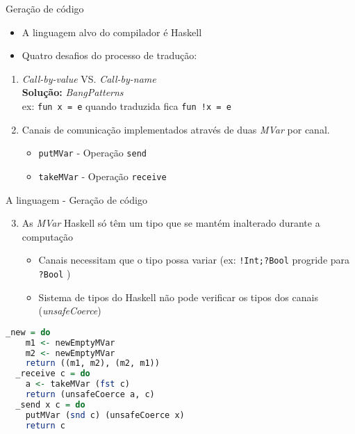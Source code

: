 \begin{frame}[fragile]{Geração de código}
  \begin{itemize}
  \item A linguagem alvo do compilador é Haskell
  \item Quatro desafios do processo de tradução:
  \end{itemize}
  \begin{enumerate}
    \item \textit{Call-by-value} VS. \textit{Call-by-name}\\
      \textbf{Solução:} \textit{BangPatterns}\\      
      ex: \lstinline|fun x = e| quando traduzida fica \lstinline|fun !x = e|
 \item Canais de comunicação implementados através de duas \textit{MVar} por canal.
   \begin{itemize}
   \item \lstinline[Haskell]|putMVar| - Operação \lstinline|send|
   \item \lstinline[Haskell]|takeMVar| - Operação \lstinline|receive|
   \end{itemize}
  \end{enumerate}

\end{frame}

\begin{frame}[fragile]{A linguagem - Geração de código}
  \begin{enumerate}
    \setcounter{enumi}{2}    
  \item As \textit{MVar} Haskell só têm um tipo que se mantém inalterado durante a computação
    \begin{itemize}
    \item Canais necessitam que o tipo possa variar (ex:
      \lstinline|!Int;?Bool| progride para \lstinline|?Bool| )
    \item Sistema de tipos do Haskell não pode verificar os tipos dos canais (\textit{unsafeCoerce})
    \end{itemize}
  \end{enumerate}
  \begin{lstlisting}[language=Haskell]
  _new = do
    m1 <- newEmptyMVar
    m2 <- newEmptyMVar
    return ((m1, m2), (m2, m1))
  _receive c = do
    a <- takeMVar (fst c)
    return (unsafeCoerce a, c)
  _send x c = do
    putMVar (snd c) (unsafeCoerce x)
    return c
\end{lstlisting}
\end{frame}

